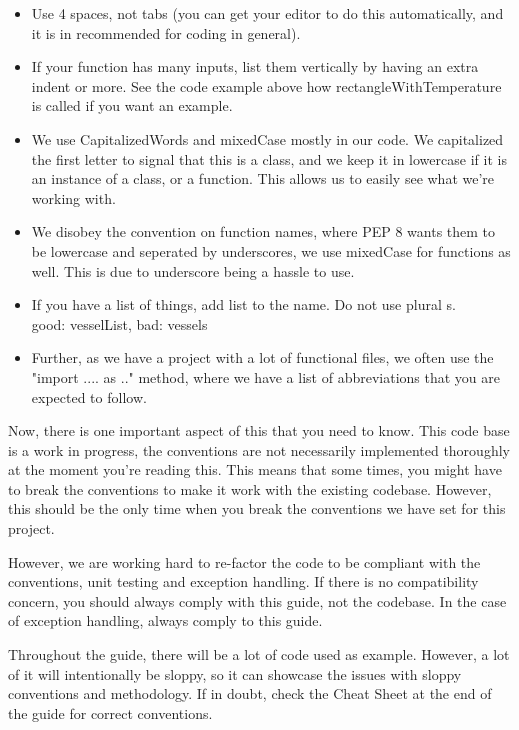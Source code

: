 \documentclass[10pt,a4paper]{article}
\begin{document}
\begin{itemize}
\item Use 4 spaces, not tabs (you can get your editor to do this automatically, and it is in recommended for coding in general).
\item If your function has many inputs, list them vertically by having an extra indent or more. See the code example above how rectangleWithTemperature is called if you want an example.
\item We use CapitalizedWords and mixedCase mostly in our code. We capitalized the first letter to signal that this is a class, and we keep it in lowercase if it is an instance of a class, or a function. This allows us to easily see what we're working with.
\item We disobey the convention on function names, where PEP 8 wants them to be lowercase and seperated by underscores, we use mixedCase for functions as well. This is due to underscore being a hassle to use.
\item If you have a list of things, add list to the name. Do not use plural s. \\
good: vesselList, bad: vessels
\item Further, as we have a project with a lot of functional files, we often use the "import .... as .." method, where we have a list of abbreviations that you are expected to follow.
\end{itemize}

Now, there is one important aspect of this that you need to know. This code base is a work in progress, the conventions are not necessarily implemented thoroughly at the moment you're reading this. This means that some times, you might have to break the conventions to make it work with the existing codebase. However, this should be the only time when you break the conventions we have set for this project.

However, we are working hard to re-factor the code to be compliant with the conventions, unit testing and exception handling. If there is no compatibility concern, you should always comply with this guide, not the codebase. In the case of exception handling, always comply to this guide.

Throughout the guide, there will be a lot of code used as example. However, a lot of it will intentionally be sloppy, so it can showcase the issues with sloppy conventions and methodology. If in doubt, check the Cheat Sheet at the end of the guide for correct conventions.
\end{document}
